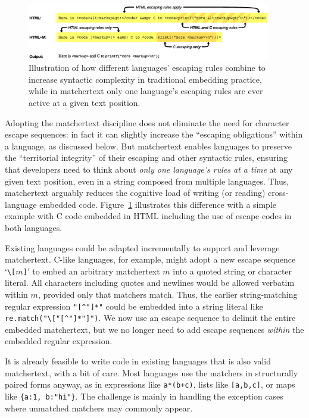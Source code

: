 \begin{figure}[t]
\begin{center}
\includegraphics[width=0.95\textwidth]{fig/territorial-integrity.eps}
\end{center}
\label{fig:territorial-integrity}
\caption{Illustration of how different languages' escaping rules
	combine to increase syntactic complexity
	in traditional embedding practice,
	while in matchertext only one language's escaping rules
	are ever active at a given text position.}
\end{figure}

Adopting the matchertext discipline
does not eliminate the need for character escape sequences:
in fact it can slightly increase the ``escaping obligations''
within a language, as discussed below.
But matchertext enables languages to preserve
the ``territorial integrity'' of their escaping and other syntactic rules,
ensuring that developers need to think about
\emph{only one language's rules at a time}
at any given text position,
even in a string composed from multiple languages.
Thus, matchertext arguably reduces the cognitive load
of writing (or reading) cross-language embedded code.
Figure~\ref{fig:territorial-integrity} illustrates this difference
with a simple example with C code embedded in HTML
including the use of escape codes in both languages.

Existing languages could be adapted incrementally
to support and leverage matchertext.
C-like languages, for example,
might adopt a new escape sequence `\verb|\[|$m$\verb|]|'
to embed an arbitrary matchertext $m$
into a quoted string or character literal.
All characters including quotes and newlines
would be allowed verbatim within $m$,
provided only that matchers match.
Thus,
the earlier string-matching regular expression
\verb|"[^"]*"|
could be embedded into a string literal
like \verb|re.match("\["[^"]*"]")|.
We now use an escape sequence
to delimit the entire embedded matchertext,
but we no longer need to add escape sequences
\emph{within} the embedded regular expression.

It is already feasible to write code in existing languages
that is also valid matchertext,
with a bit of care.
Most languages use the matchers in structurally paired forms anyway,
as in expressions like \verb|a*(b+c)|,
lists like \verb|[a,b,c]|,
or maps like \verb|{a:1, b:"hi"}|.
The challenge is mainly in handling the exception cases
where unmatched matchers may commonly appear.

